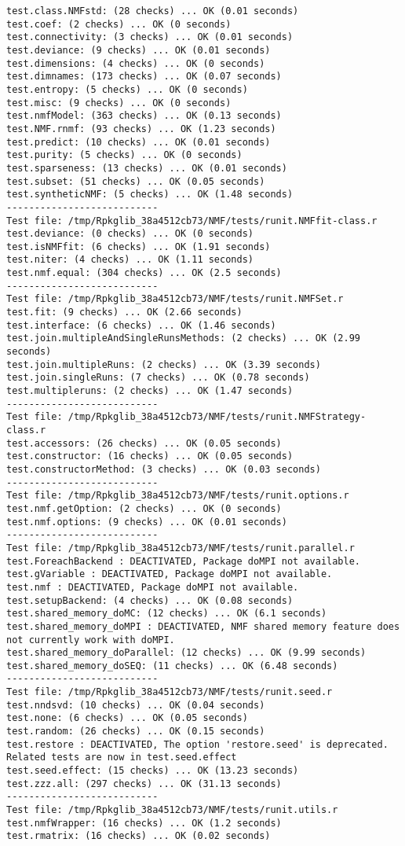 \documentclass[10pt]{article}
\begin{document}
\begin{verbatim}
test.class.NMFstd: (28 checks) ... OK (0.01 seconds)
test.coef: (2 checks) ... OK (0 seconds)
test.connectivity: (3 checks) ... OK (0.01 seconds)
test.deviance: (9 checks) ... OK (0.01 seconds)
test.dimensions: (4 checks) ... OK (0 seconds)
test.dimnames: (173 checks) ... OK (0.07 seconds)
test.entropy: (5 checks) ... OK (0 seconds)
test.misc: (9 checks) ... OK (0 seconds)
test.nmfModel: (363 checks) ... OK (0.13 seconds)
test.NMF.rnmf: (93 checks) ... OK (1.23 seconds)
test.predict: (10 checks) ... OK (0.01 seconds)
test.purity: (5 checks) ... OK (0 seconds)
test.sparseness: (13 checks) ... OK (0.01 seconds)
test.subset: (51 checks) ... OK (0.05 seconds)
test.syntheticNMF: (5 checks) ... OK (1.48 seconds)
--------------------------- 
Test file: /tmp/Rpkglib_38a4512cb73/NMF/tests/runit.NMFfit-class.r 
test.deviance: (0 checks) ... OK (0 seconds)
test.isNMFfit: (6 checks) ... OK (1.91 seconds)
test.niter: (4 checks) ... OK (1.11 seconds)
test.nmf.equal: (304 checks) ... OK (2.5 seconds)
--------------------------- 
Test file: /tmp/Rpkglib_38a4512cb73/NMF/tests/runit.NMFSet.r 
test.fit: (9 checks) ... OK (2.66 seconds)
test.interface: (6 checks) ... OK (1.46 seconds)
test.join.multipleAndSingleRunsMethods: (2 checks) ... OK (2.99 seconds)
test.join.multipleRuns: (2 checks) ... OK (3.39 seconds)
test.join.singleRuns: (7 checks) ... OK (0.78 seconds)
test.multipleruns: (2 checks) ... OK (1.47 seconds)
--------------------------- 
Test file: /tmp/Rpkglib_38a4512cb73/NMF/tests/runit.NMFStrategy-class.r 
test.accessors: (26 checks) ... OK (0.05 seconds)
test.constructor: (16 checks) ... OK (0.05 seconds)
test.constructorMethod: (3 checks) ... OK (0.03 seconds)
--------------------------- 
Test file: /tmp/Rpkglib_38a4512cb73/NMF/tests/runit.options.r 
test.nmf.getOption: (2 checks) ... OK (0 seconds)
test.nmf.options: (9 checks) ... OK (0.01 seconds)
--------------------------- 
Test file: /tmp/Rpkglib_38a4512cb73/NMF/tests/runit.parallel.r 
test.ForeachBackend : DEACTIVATED, Package doMPI not available.
test.gVariable : DEACTIVATED, Package doMPI not available.
test.nmf : DEACTIVATED, Package doMPI not available.
test.setupBackend: (4 checks) ... OK (0.08 seconds)
test.shared_memory_doMC: (12 checks) ... OK (6.1 seconds)
test.shared_memory_doMPI : DEACTIVATED, NMF shared memory feature does not currently work with doMPI.
test.shared_memory_doParallel: (12 checks) ... OK (9.99 seconds)
test.shared_memory_doSEQ: (11 checks) ... OK (6.48 seconds)
--------------------------- 
Test file: /tmp/Rpkglib_38a4512cb73/NMF/tests/runit.seed.r 
test.nndsvd: (10 checks) ... OK (0.04 seconds)
test.none: (6 checks) ... OK (0.05 seconds)
test.random: (26 checks) ... OK (0.15 seconds)
test.restore : DEACTIVATED, The option 'restore.seed' is deprecated. Related tests are now in test.seed.effect
test.seed.effect: (15 checks) ... OK (13.23 seconds)
test.zzz.all: (297 checks) ... OK (31.13 seconds)
--------------------------- 
Test file: /tmp/Rpkglib_38a4512cb73/NMF/tests/runit.utils.r 
test.nmfWrapper: (16 checks) ... OK (1.2 seconds)
test.rmatrix: (16 checks) ... OK (0.02 seconds)


\end{verbatim}
\end{document}
